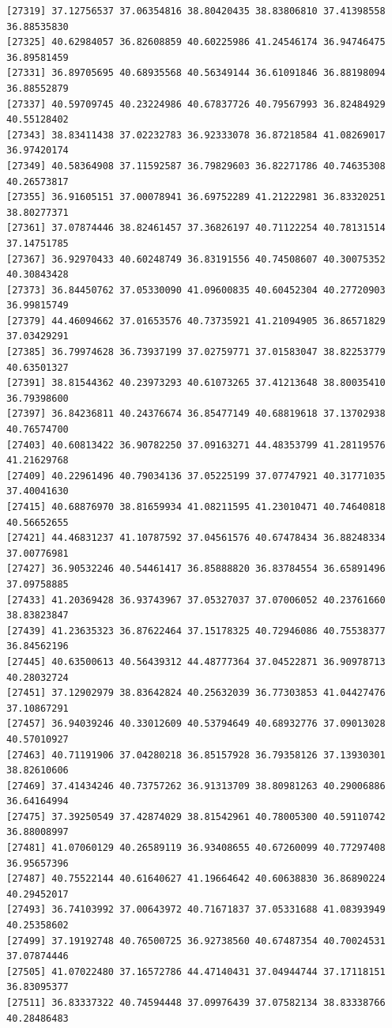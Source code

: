 \documentclass[
  letterpaper,
  DIV=11,
  numbers=noendperiod]{scrartcl}
\begin{document}
\begin{verbatim}
[27319] 37.12756537 37.06354816 38.80420435 38.83806810 37.41398558 36.88535830
[27325] 40.62984057 36.82608859 40.60225986 41.24546174 36.94746475 36.89581459
[27331] 36.89705695 40.68935568 40.56349144 36.61091846 36.88198094 36.88552879
[27337] 40.59709745 40.23224986 40.67837726 40.79567993 36.82484929 40.55128402
[27343] 38.83411438 37.02232783 36.92333078 36.87218584 41.08269017 36.97420174
[27349] 40.58364908 37.11592587 36.79829603 36.82271786 40.74635308 40.26573817
[27355] 36.91605151 37.00078941 36.69752289 41.21222981 36.83320251 38.80277371
[27361] 37.07874446 38.82461457 37.36826197 40.71122254 40.78131514 37.14751785
[27367] 36.92970433 40.60248749 36.83191556 40.74508607 40.30075352 40.30843428
[27373] 36.84450762 37.05330090 41.09600835 40.60452304 40.27720903 36.99815749
[27379] 44.46094662 37.01653576 40.73735921 41.21094905 36.86571829 37.03429291
[27385] 36.79974628 36.73937199 37.02759771 37.01583047 38.82253779 40.63501327
[27391] 38.81544362 40.23973293 40.61073265 37.41213648 38.80035410 36.79398600
[27397] 36.84236811 40.24376674 36.85477149 40.68819618 37.13702938 40.76574700
[27403] 40.60813422 36.90782250 37.09163271 44.48353799 41.28119576 41.21629768
[27409] 40.22961496 40.79034136 37.05225199 37.07747921 40.31771035 37.40041630
[27415] 40.68876970 38.81659934 41.08211595 41.23010471 40.74640818 40.56652655
[27421] 44.46831237 41.10787592 37.04561576 40.67478434 36.88248334 37.00776981
[27427] 36.90532246 40.54461417 36.85888820 36.83784554 36.65891496 37.09758885
[27433] 41.20369428 36.93743967 37.05327037 37.07006052 40.23761660 38.83823847
[27439] 41.23635323 36.87622464 37.15178325 40.72946086 40.75538377 36.84562196
[27445] 40.63500613 40.56439312 44.48777364 37.04522871 36.90978713 40.28032724
[27451] 37.12902979 38.83642824 40.25632039 36.77303853 41.04427476 37.10867291
[27457] 36.94039246 40.33012609 40.53794649 40.68932776 37.09013028 40.57010927
[27463] 40.71191906 37.04280218 36.85157928 36.79358126 37.13930301 38.82610606
[27469] 37.41434246 40.73757262 36.91313709 38.80981263 40.29006886 36.64164994
[27475] 37.39250549 37.42874029 38.81542961 40.78005300 40.59110742 36.88008997
[27481] 41.07060129 40.26589119 36.93408655 40.67260099 40.77297408 36.95657396
[27487] 40.75522144 40.61640627 41.19664642 40.60638830 36.86890224 40.29452017
[27493] 36.74103992 37.00643972 40.71671837 37.05331688 41.08393949 40.25358602
[27499] 37.19192748 40.76500725 36.92738560 40.67487354 40.70024531 37.07874446
[27505] 41.07022480 37.16572786 44.47140431 37.04944744 37.17118151 36.83095377
[27511] 36.83337322 40.74594448 37.09976439 37.07582134 38.83338766 40.28486483

\end{verbatim}
\end{document}
